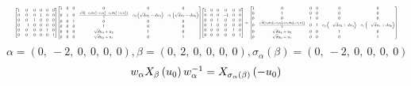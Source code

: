 \documentclass[11pt]{article}
\theoremstyle{definition}
\begin{document}
\[
\scaletoalign{\textwidth}{{\left[\begin{matrix}1 & 0 & 0 & 0 & 0 & 0\\0 & 0 & 0 & 1 & 0 & 0\\0 & 0 & 1 & 0 & 0 & 0\\0 & -1 & 0 & 0 & 0 & 0\\0 & 0 & 0 & 0 & 1 & 0\\0 & 0 & 0 & 0 & 0 & 1\end{matrix}\right]} {\left[\begin{matrix}1 & 0 & 0 & 0 & 0 & 0\\0 & 1 & 0 & \frac{\sqrt{d} \left(- c_{0} d u_{3}^{2} + c_{0} u_{2}^{2} - c_{1} d u_{0}^{2} + c_{1} u_{1}^{2}\right)}{2} & c_{0} \left(\sqrt{d} u_{2} - d u_{3}\right) & c_{1} \left(\sqrt{d} u_{1} - d u_{0}\right)\\0 & 0 & 1 & 0 & 0 & 0\\0 & 0 & 0 & 1 & 0 & 0\\0 & 0 & 0 & \sqrt{d} u_{3} + u_{2} & 1 & 0\\0 & 0 & 0 & \sqrt{d} u_{0} + u_{1} & 0 & 1\end{matrix}\right]} {\left[\begin{matrix}1 & 0 & 0 & 0 & 0 & 0\\0 & 0 & 0 & -1 & 0 & 0\\0 & 0 & 1 & 0 & 0 & 0\\0 & 1 & 0 & 0 & 0 & 0\\0 & 0 & 0 & 0 & 1 & 0\\0 & 0 & 0 & 0 & 0 & 1\end{matrix}\right]} = {\left[\begin{matrix}1 & 0 & 0 & 0 & 0 & 0\\0 & 1 & 0 & 0 & 0 & 0\\0 & 0 & 1 & 0 & 0 & 0\\0 & \frac{\sqrt{d} \left(c_{0} d u_{3}^{2} - c_{0} u_{2}^{2} + c_{1} d u_{0}^{2} - c_{1} u_{1}^{2}\right)}{2} & 0 & 1 & c_{0} \left(- \sqrt{d} u_{2} + d u_{3}\right) & c_{1} \left(- \sqrt{d} u_{1} + d u_{0}\right)\\0 & \sqrt{d} u_{3} + u_{2} & 0 & 0 & 1 & 0\\0 & \sqrt{d} u_{0} + u_{1} & 0 & 0 & 0 & 1\end{matrix}\right]}}
\]
\[
\alpha = \left( 0, \  -2, \  0, \  0, \  0, \  0\right), \beta = \left( 0, \  2, \  0, \  0, \  0, \  0\right), \sigma_{\alpha}(\beta) = \left( 0, \  -2, \  0, \  0, \  0, \  0\right)
\]
\[
\scaletoalign{\textwidth}{w_{\alpha} X_{\beta}\left(u_{0}\right) w_{\alpha}^{-1} = X_{\sigma_{\alpha}\left(\beta\right)}\left(- u_{0}\right)}
\]
\end{document}
